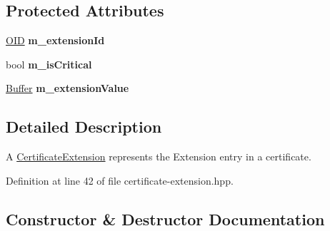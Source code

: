 \subsection*{Protected Attributes}
\begin{DoxyCompactItemize}
\item 
\hyperlink{classndn_1_1OID}{O\+ID} {\bfseries m\+\_\+extension\+Id}\hypertarget{classndn_1_1CertificateExtension_acddecc2fbed03d541a6e1ac5c24f270f}{}\label{classndn_1_1CertificateExtension_acddecc2fbed03d541a6e1ac5c24f270f}

\item 
bool {\bfseries m\+\_\+is\+Critical}\hypertarget{classndn_1_1CertificateExtension_ae72f31fa7528bbc6879e4813fbf77fc7}{}\label{classndn_1_1CertificateExtension_ae72f31fa7528bbc6879e4813fbf77fc7}

\item 
\hyperlink{classndn_1_1Buffer}{Buffer} {\bfseries m\+\_\+extension\+Value}\hypertarget{classndn_1_1CertificateExtension_a018a09e2e7f15d88669e1373d6620e30}{}\label{classndn_1_1CertificateExtension_a018a09e2e7f15d88669e1373d6620e30}

\end{DoxyCompactItemize}


\subsection{Detailed Description}
A \hyperlink{classndn_1_1CertificateExtension}{Certificate\+Extension} represents the Extension entry in a certificate. 

Definition at line 42 of file certificate-\/extension.\+hpp.



\subsection{Constructor \& Destructor Documentation}
